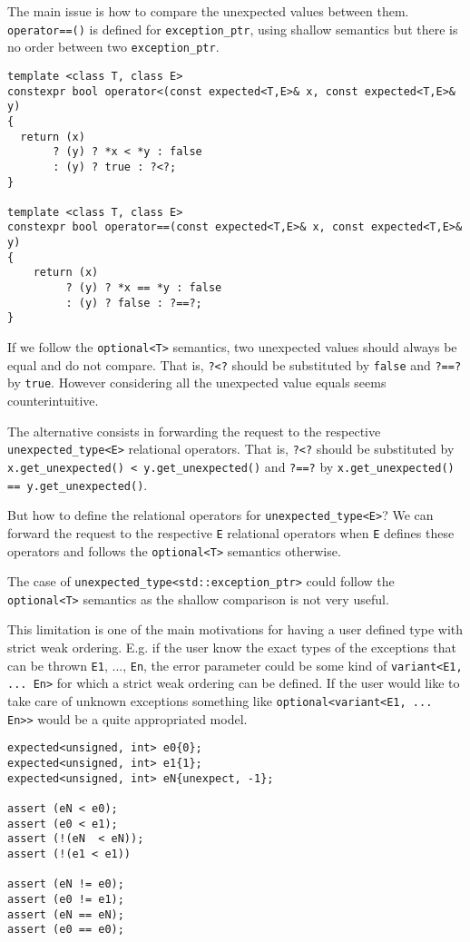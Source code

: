 \documentclass[a4paper,10pt]{article}
\newcommand{\cpp}[1]{\lstinline{#1}}
\begin{document}
The main issue is how to compare the unexpected values between them.  \cpp{operator==()} is defined for \cpp{exception_ptr}, using shallow semantics but there is no order between two \cpp{exception_ptr}.

\begin{lstlisting}
template <class T, class E>
constexpr bool operator<(const expected<T,E>& x, const expected<T,E>& y)
{
  return (x)
       ? (y) ? *x < *y : false
       : (y) ? true : ?<?;
}

template <class T, class E>
constexpr bool operator==(const expected<T,E>& x, const expected<T,E>& y)
{
    return (x)
         ? (y) ? *x == *y : false
         : (y) ? false : ?==?;
}
\end{lstlisting}

If we follow the \cpp{optional<T>} semantics, two unexpected values should always be equal and do not compare. That is, \cpp{?<?} should be substituted by \cpp{false} and \cpp{?==?} by \cpp{true}. However considering all the unexpected value equals seems counterintuitive.

The alternative consists in forwarding the request to the respective  \cpp{unexpected_type<E>} relational operators. That is, \cpp{?<?} should be substituted by \cpp{x.get_unexpected() < y.get_unexpected()} and \cpp{?==?} by \cpp{x.get_unexpected()} \cpp{== y.get_unexpected()}. 

But how to define the relational operators for \cpp{unexpected_type<E>}? We can forward the request to the respective \cpp{E} relational operators when \cpp{E} defines these operators and follows the \cpp{optional<T>} semantics otherwise. 

The case of \cpp{unexpected_type<std::exception_ptr>} could follow the \cpp{optional<T>} semantics as the shallow comparison is not very useful.

This limitation is one of the main motivations for having a user defined type with strict weak ordering. E.g. if the user know the exact types of the exceptions that can be thrown \cpp{E1}, ..., \cpp{En}, the error parameter could be some kind of \cpp{variant<E1, ... En>} for which a strict weak ordering can be defined. If the user would like to take care of unknown exceptions something like \cpp{optional<variant<E1, ... En>>} would be a quite appropriated model. 

\begin{lstlisting}
expected<unsigned, int> e0{0};
expected<unsigned, int> e1{1};
expected<unsigned, int> eN{unexpect, -1};

assert (eN < e0);
assert (e0 < e1);
assert (!(eN  < eN));
assert (!(e1 < e1))

assert (eN != e0);
assert (e0 != e1);
assert (eN == eN);
assert (e0 == e0);
\end{lstlisting}
\end{document}
